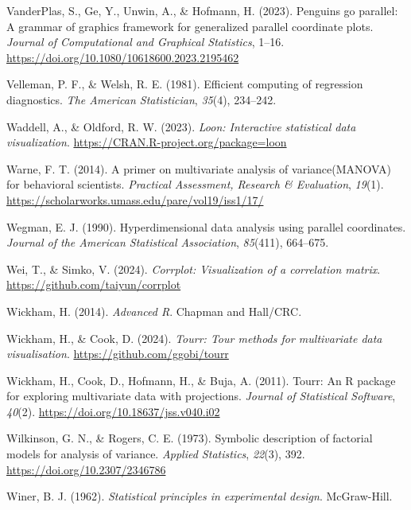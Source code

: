 \documentclass[
  letterpaper,
  10pt,
  krantz2]{krantz}
\newlength{\cslhangindent}
\newenvironment{CSLReferences}[2] %
 {\begin{list}{}{%
  \setlength{\itemindent}{0pt}
  \setlength{\leftmargin}{0pt}
  \setlength{\parsep}{0pt}
  \ifodd #1
   \setlength{\leftmargin}{\cslhangindent}
   \setlength{\itemindent}{-1\cslhangindent}
  \fi
  \setlength{\itemsep}{#2\baselineskip}}}
 {\end{list}}
\begin{document}
\begin{CSLReferences}{1}{0}
VanderPlas, S., Ge, Y., Unwin, A., \& Hofmann, H. (2023). Penguins go
parallel: A grammar of graphics framework for generalized parallel
coordinate plots. \emph{Journal of Computational and Graphical
Statistics}, 1--16. \url{https://doi.org/10.1080/10618600.2023.2195462}

Velleman, P. F., \& Welsh, R. E. (1981). Efficient computing of
regression diagnostics. \emph{The American Statistician}, \emph{35}(4),
234--242.

Waddell, A., \& Oldford, R. W. (2023). \emph{Loon: Interactive
statistical data visualization}.
\url{https://CRAN.R-project.org/package=loon}

Warne, F. T. (2014). A primer on multivariate analysis of
variance(MANOVA) for behavioral scientists. \emph{Practical Assessment,
Research \& Evaluation}, \emph{19}(1).
\url{https://scholarworks.umass.edu/pare/vol19/iss1/17/}

Wegman, E. J. (1990). Hyperdimensional data analysis using parallel
coordinates. \emph{Journal of the American Statistical Association},
\emph{85}(411), 664--675.

Wei, T., \& Simko, V. (2024). \emph{Corrplot: Visualization of a
correlation matrix}. \url{https://github.com/taiyun/corrplot}

Wickham, H. (2014). \emph{{Advanced R}}. {Chapman and Hall/CRC}.

Wickham, H., \& Cook, D. (2024). \emph{Tourr: Tour methods for
multivariate data visualisation}. \url{https://github.com/ggobi/tourr}

Wickham, H., Cook, D., Hofmann, H., \& Buja, A. (2011). Tourr: An {R}
package for exploring multivariate data with projections. \emph{Journal
of Statistical Software}, \emph{40}(2).
\url{https://doi.org/10.18637/jss.v040.i02}

Wilkinson, G. N., \& Rogers, C. E. (1973). Symbolic description of
factorial models for analysis of variance. \emph{Applied Statistics},
\emph{22}(3), 392. \url{https://doi.org/10.2307/2346786}

Winer, B. J. (1962). \emph{Statistical principles in experimental
design}. McGraw-Hill.


\end{CSLReferences}
\end{document}
